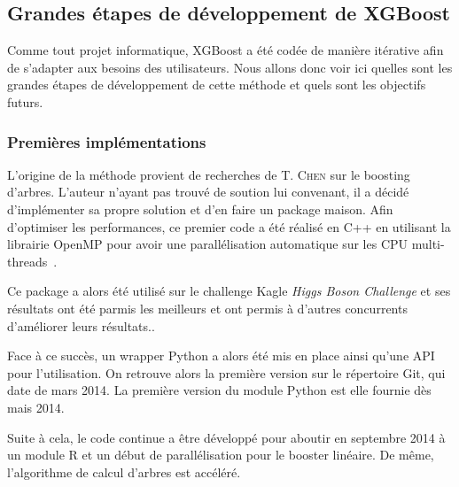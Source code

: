 \subsection{Grandes étapes de développement de XGBoost}
\label{sec:historique}
Comme tout projet informatique, XGBoost a été codée de manière itérative afin de s'adapter aux besoins des utilisateurs. Nous allons donc voir ici quelles sont les grandes étapes de développement de cette méthode et quels sont les objectifs futurs.

\subsubsection{Premières implémentations}
L'origine de la méthode provient de recherches de T. \textsc{Chen} sur le boosting d'arbres. L'auteur n'ayant pas trouvé de soution lui convenant, il a décidé d'implémenter sa propre solution et d'en faire un package \og maison\fg. Afin d'optimiser les performances, ce premier code a été réalisé en C++ en utilisant la librairie OpenMP pour avoir une parallélisation automatique sur les CPU multi-threads~\cite{bib:boson}.

Ce package a alors été utilisé sur le challenge Kagle \textit{Higgs Boson Challenge} et ses résultats ont été parmis les meilleurs et ont permis à d'autres concurrents d'améliorer leurs résultats..

Face à ce succès, un wrapper Python a alors été mis en place ainsi qu'une API pour l'utilisation. On retrouve alors la première version sur le répertoire Git, qui date de mars 2014. La première version du module Python est elle fournie dès mais 2014.

Suite à cela, le code continue a être développé pour aboutir en septembre 2014 à un module R et un début de parallélisation pour le booster linéaire. De même, l'algorithme de calcul d'arbres est accéléré.

